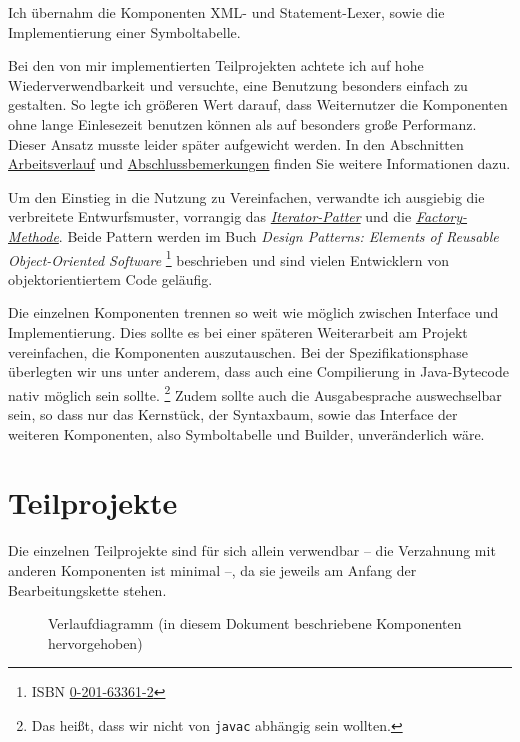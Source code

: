 \documentclass[10pt,a4paper,ngerman,titlepage,tocindentauto]{article}
\begin{document}
		Ich übernahm die Komponenten XML- und Statement-Lexer, sowie die Implementierung einer Symboltabelle.
		
		Bei den von mir implementierten Teilprojekten achtete ich auf hohe Wiederverwendbarkeit
		und versuchte, eine Benutzung besonders einfach zu gestalten. So legte ich größeren Wert darauf,
		dass Weiternutzer die Komponenten ohne lange Einlesezeit benutzen können als auf besonders große
		Performanz. Dieser Ansatz musste leider später aufgewicht werden. In den Abschnitten
		\hyperlink{Arbeitsverlauf}{Arbeitsverlauf} und \hyperlink{Abschlussbemerkungen}{Abschlussbemerkungen}
		finden Sie weitere Informationen dazu.
		
		Um den Einstieg in die Nutzung zu Vereinfachen, verwandte ich ausgiebig die verbreitete Entwurfsmuster,
		vorrangig das \href{http://c2.com/cgi/wiki?IteratorPattern}{\em Iterator-Patter} und die
		\href{http://c2.com/cgi/wiki?FactoryMethodPattern}{\em Factory-Methode}.
		Beide Pattern werden im Buch {\em Design Patterns: Elements of Reusable Object-Oriented Software}%
		\footnote{ISBN \href{https://portal.d-nb.de/opac.htm?method=simpleSearch&query=0201633612}{0-201-63361-2}}
		beschrieben und sind vielen Entwicklern von objektorientiertem Code geläufig.
		
		Die einzelnen Komponenten trennen so weit wie möglich zwischen Interface und Implementierung.
		Dies sollte es bei einer späteren Weiterarbeit am Projekt vereinfachen, die Komponenten
		auszutauschen. Bei der Spezifikationsphase überlegten wir uns unter anderem, dass auch eine
		Compilierung in Java-Bytecode nativ möglich sein sollte.%
		\footnote{Das heißt, dass wir nicht von \texttt{javac} abhängig sein wollten.}
		Zudem sollte auch die Ausgabesprache auswechselbar sein, so dass nur das Kernstück,
		der Syntaxbaum, sowie das Interface der weiteren Komponenten, also Symboltabelle und Builder,
		unveränderlich wäre.
		
	\section{Teilprojekte}
		Die einzelnen Teilprojekte sind für sich allein verwendbar – die Verzahnung
		mit anderen Komponenten ist minimal –, da sie jeweils am Anfang der Bearbeitungskette stehen.
		
		\begin{figure}[ht]
			\caption[Verlaufdiagramm]{Verlaufdiagramm (in diesem Dokument beschriebene Komponenten hervorgehoben)}
		\end{figure}
		
\end{document}
